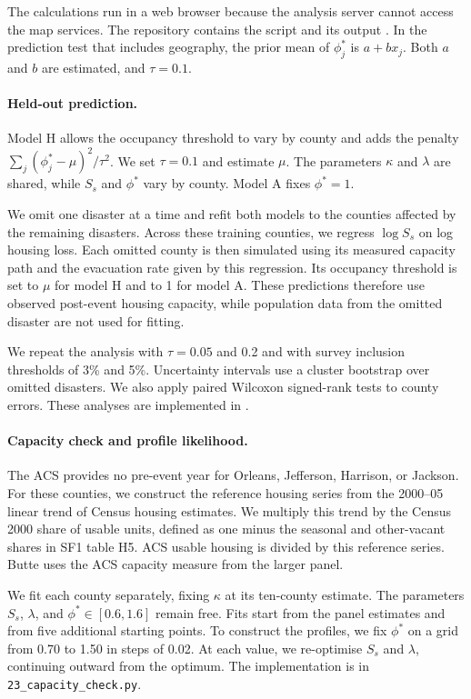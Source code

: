\documentclass[11pt]{article}
\begin{document}
The calculations run in a web browser because the analysis server cannot access the map services. The repository contains the script  and its output . In the prediction test that includes geography, the prior mean of $\phi^*_j$ is $a+bx_j$. Both $a$ and $b$ are estimated, and $\tau=0.1$.

\paragraph{Held-out prediction.} Model H allows the occupancy threshold to vary by county and adds the penalty $\sum_j(\phi^*_j-\mu)^2/\tau^2$. We set $\tau=0.1$ and estimate $\mu$. The parameters $\kappa$ and $\lambda$ are shared, while $S_s$ and $\phi^*$ vary by county. Model A fixes $\phi^*=1$.

We omit one disaster at a time and refit both models to the counties affected by the remaining disasters. Across these training counties, we regress $\log S_s$ on log housing loss. Each omitted county is then simulated using its measured capacity path and the evacuation rate given by this regression. Its occupancy threshold is set to $\mu$ for model H and to 1 for model A. These predictions therefore use observed post-event housing capacity, while population data from the omitted disaster are not used for fitting.

We repeat the analysis with $\tau=0.05$ and 0.2 and with survey inclusion thresholds of 3\% and 5\%. Uncertainty intervals use a cluster bootstrap over omitted disasters. We also apply paired Wilcoxon signed-rank tests to county errors. These analyses are implemented in .

\paragraph{Capacity check and profile likelihood.} The ACS provides no pre-event year for Orleans, Jefferson, Harrison, or Jackson. For these counties, we construct the reference housing series from the 2000--05 linear trend of Census housing estimates. We multiply this trend by the Census 2000 share of usable units, defined as one minus the seasonal and other-vacant shares in SF1 table H5. ACS usable housing is divided by this reference series. Butte uses the ACS capacity measure from the larger panel.

We fit each county separately, fixing $\kappa$ at its ten-county estimate. The parameters $S_s$, $\lambda$, and $\phi^*\in[0.6,1.6]$ remain free. Fits start from the panel estimates and from five additional starting points. To construct the profiles, we fix $\phi^*$ on a grid from 0.70 to 1.50 in steps of 0.02. At each value, we re-optimise $S_s$ and $\lambda$, continuing outward from the optimum. The implementation is in \texttt{23\_capacity\_check.py}.
\end{document}
